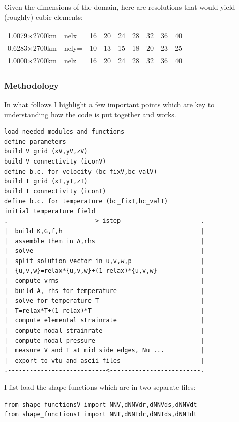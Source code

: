\noindent Given the dimensions of the domain, here are resolutions that would yield (roughly) cubic elements:
\begin{center}
\begin{tabular}{l|lccccccc|}
1.0079$\times$2700km&nelx= &16 &20 &24 &28 &32 &36 &40 \\  
0.6283$\times$2700km&nely= &10 &13 &15 &18 &20 &23 &25 \\
1.0000$\times$2700km&nelz= &16 &20 &24 &28 &32 &36 &40 \\  
\end{tabular}
\end{center}

\subsubsection*{Methodology}

In what follows I highlight a few important points which are key to understanding how the code
is put together and works. 

\begin{verbatim}
load needed modules and functions
define parameters
build V grid (xV,yV,zV)
build V connectivity (iconV)
define b.c. for velocity (bc_fixV,bc_valV)
build T grid (xT,yT,zT)
build T connectivity (iconT)
define b.c. for temperature (bc_fixT,bc_valT)
initial temperature field
.------------------------> istep ---------------------.
|  build K,G,f,h                                      |
|  assemble them in A,rhs                             |
|  solve                                              |
|  split solution vector in u,v,w,p                   |
|  {u,v,w}=relax*{u,v,w}+(1-relax)*{u,v,w}            |
|  compute vrms                                       |
|  build A, rhs for temperature                       |
|  solve for temperature T                            |
|  T=relax*T+(1-relax)*T                              |
|  compute elemental strainrate                       |
|  compute nodal strainrate                           |
|  compute nodal pressure                             |
|  measure V and T at mid side edges, Nu ...          |
|  export to vtu and ascii files                      | 
.---------------------------<-------------------------.
\end{verbatim}

I fist load the shape functions which are in two separate files:

\begin{lstlisting}
from shape_functionsV import NNV,dNNVdr,dNNVds,dNNVdt
from shape_functionsT import NNT,dNNTdr,dNNTds,dNNTdt
\end{lstlisting}

